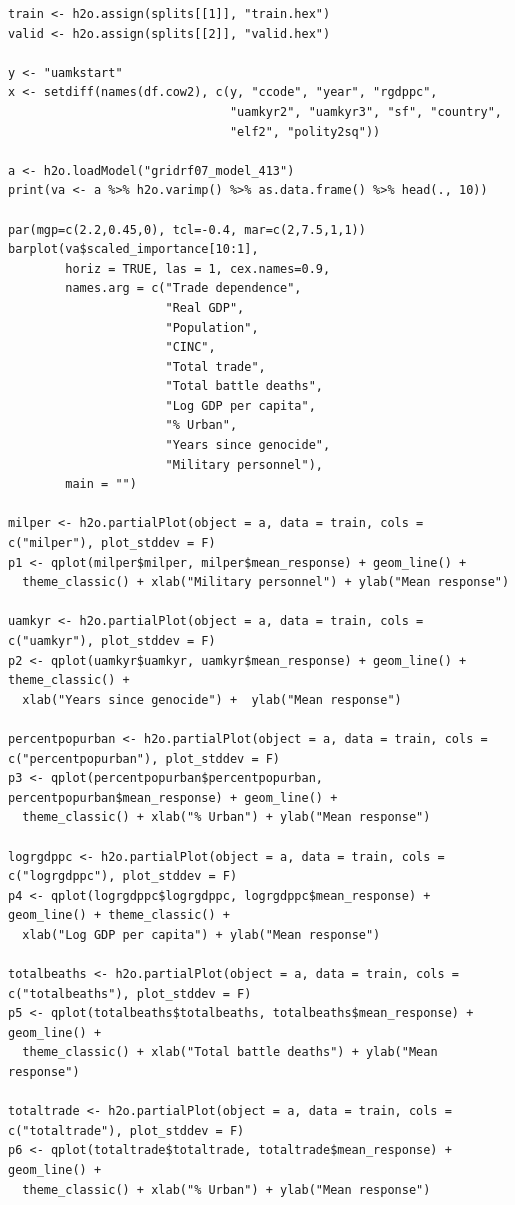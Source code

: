 \documentclass[a4paper,12pt]{article}
\begin{document}
\begin{verbatim}
train <- h2o.assign(splits[[1]], "train.hex")   
valid <- h2o.assign(splits[[2]], "valid.hex") 

y <- "uamkstart"
x <- setdiff(names(df.cow2), c(y, "ccode", "year", "rgdppc",
                               "uamkyr2", "uamkyr3", "sf", "country",
                               "elf2", "polity2sq")) 

a <- h2o.loadModel("gridrf07_model_413")
print(va <- a %>% h2o.varimp() %>% as.data.frame() %>% head(., 10)) 

par(mgp=c(2.2,0.45,0), tcl=-0.4, mar=c(2,7.5,1,1))
barplot(va$scaled_importance[10:1],
        horiz = TRUE, las = 1, cex.names=0.9,
        names.arg = c("Trade dependence",
                      "Real GDP",
                      "Population",
                      "CINC",
                      "Total trade",
                      "Total battle deaths",
                      "Log GDP per capita",
                      "% Urban", 
                      "Years since genocide", 
                      "Military personnel"),
        main = "")

milper <- h2o.partialPlot(object = a, data = train, cols = c("milper"), plot_stddev = F)
p1 <- qplot(milper$milper, milper$mean_response) + geom_line() +
  theme_classic() + xlab("Military personnel") + ylab("Mean response")

uamkyr <- h2o.partialPlot(object = a, data = train, cols = c("uamkyr"), plot_stddev = F)
p2 <- qplot(uamkyr$uamkyr, uamkyr$mean_response) + geom_line() + theme_classic() + 
  xlab("Years since genocide") +  ylab("Mean response")

percentpopurban <- h2o.partialPlot(object = a, data = train, cols = c("percentpopurban"), plot_stddev = F)
p3 <- qplot(percentpopurban$percentpopurban, percentpopurban$mean_response) + geom_line() +
  theme_classic() + xlab("% Urban") + ylab("Mean response")

logrgdppc <- h2o.partialPlot(object = a, data = train, cols = c("logrgdppc"), plot_stddev = F)
p4 <- qplot(logrgdppc$logrgdppc, logrgdppc$mean_response) + geom_line() + theme_classic() +
  xlab("Log GDP per capita") + ylab("Mean response")

totalbeaths <- h2o.partialPlot(object = a, data = train, cols = c("totalbeaths"), plot_stddev = F)
p5 <- qplot(totalbeaths$totalbeaths, totalbeaths$mean_response) + geom_line() +
  theme_classic() + xlab("Total battle deaths") + ylab("Mean response")

totaltrade <- h2o.partialPlot(object = a, data = train, cols = c("totaltrade"), plot_stddev = F)
p6 <- qplot(totaltrade$totaltrade, totaltrade$mean_response) + geom_line() +
  theme_classic() + xlab("% Urban") + ylab("Mean response")


\end{verbatim}
\end{document}
